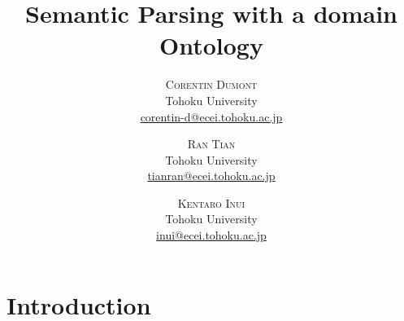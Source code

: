 \documentclass[twocolumn]{article}
\title{Semantic Parsing with a domain Ontology} %
\author{%
\textsc{Corentin Dumont} \\[1ex] %
\normalsize Tohoku University \\ %
\normalsize \href{corentin-d@ecei.tohoku.ac.jp}{corentin-d@ecei.tohoku.ac.jp} %
\and %
\textsc{Ran Tian} \\[1ex] %
\normalsize Tohoku University \\ %
\normalsize \href{tianran@ecei.tohoku.ac.jp}{tianran@ecei.tohoku.ac.jp} %
\and %
\textsc{Kentaro Inui} \\[1ex] %
\normalsize Tohoku University \\ %
\normalsize \href{inui@ecei.tohoku.ac.jp}{inui@ecei.tohoku.ac.jp} %
}
\date{}
\begin{document}
\maketitle


\section{Introduction}

\end{document}
